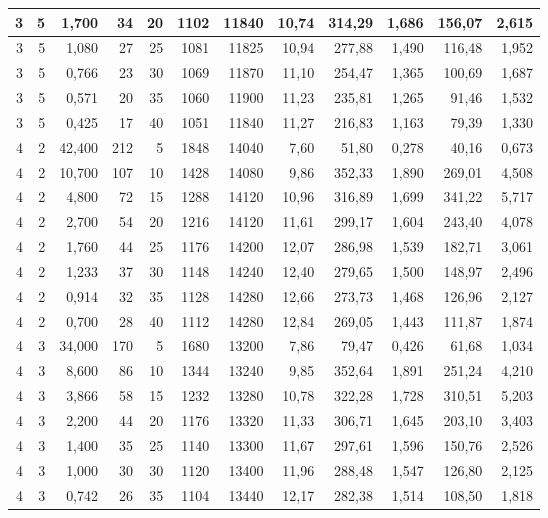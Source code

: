 \begin{tabular}{rrrrrrrrrrrr}
3 & 5 & 1,700 & 34 & 20 & 1102 & 11840 & 10,74 & 314,29 & 1,686 & 156,07 & 2,615 \\ \hline
3 & 5 & 1,080 & 27 & 25 & 1081 & 11825 & 10,94 & 277,88 & 1,490 & 116,48 & 1,952 \\ \hline
3 & 5 & 0,766 & 23 & 30 & 1069 & 11870 & 11,10 & 254,47 & 1,365 & 100,69 & 1,687 \\ \hline
3 & 5 & 0,571 & 20 & 35 & 1060 & 11900 & 11,23 & 235,81 & 1,265 & 91,46 & 1,532 \\ \hline
3 & 5 & 0,425 & 17 & 40 & 1051 & 11840 & 11,27 & 216,83 & 1,163 & 79,39 & 1,330 \\ \hline
4 & 2 & 42,400 & 212 & 5 & 1848 & 14040 & 7,60 & 51,80 & 0,278 & 40,16 & 0,673 \\ \hline
4 & 2 & 10,700 & 107 & 10 & 1428 & 14080 & 9,86 & 352,33 & 1,890 & 269,01 & 4,508 \\ \hline
4 & 2 & 4,800 & 72 & 15 & 1288 & 14120 & 10,96 & 316,89 & 1,699 & 341,22 & 5,717 \\ \hline
4 & 2 & 2,700 & 54 & 20 & 1216 & 14120 & 11,61 & 299,17 & 1,604 & 243,40 & 4,078 \\ \hline
4 & 2 & 1,760 & 44 & 25 & 1176 & 14200 & 12,07 & 286,98 & 1,539 & 182,71 & 3,061 \\ \hline
4 & 2 & 1,233 & 37 & 30 & 1148 & 14240 & 12,40 & 279,65 & 1,500 & 148,97 & 2,496 \\ \hline
4 & 2 & 0,914 & 32 & 35 & 1128 & 14280 & 12,66 & 273,73 & 1,468 & 126,96 & 2,127 \\ \hline
4 & 2 & 0,700 & 28 & 40 & 1112 & 14280 & 12,84 & 269,05 & 1,443 & 111,87 & 1,874 \\ \hline
4 & 3 & 34,000 & 170 & 5 & 1680 & 13200 & 7,86 & 79,47 & 0,426 & 61,68 & 1,034 \\ \hline
4 & 3 & 8,600 & 86 & 10 & 1344 & 13240 & 9,85 & 352,64 & 1,891 & 251,24 & 4,210 \\ \hline
4 & 3 & 3,866 & 58 & 15 & 1232 & 13280 & 10,78 & 322,28 & 1,728 & 310,51 & 5,203 \\ \hline
4 & 3 & 2,200 & 44 & 20 & 1176 & 13320 & 11,33 & 306,71 & 1,645 & 203,10 & 3,403 \\ \hline
4 & 3 & 1,400 & 35 & 25 & 1140 & 13300 & 11,67 & 297,61 & 1,596 & 150,76 & 2,526 \\ \hline
4 & 3 & 1,000 & 30 & 30 & 1120 & 13400 & 11,96 & 288,48 & 1,547 & 126,80 & 2,125 \\ \hline
4 & 3 & 0,742 & 26 & 35 & 1104 & 13440 & 12,17 & 282,38 & 1,514 & 108,50 & 1,818 \\ \hline

\end{tabular}
